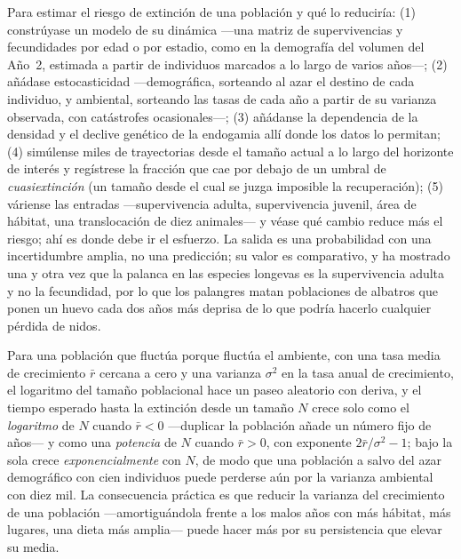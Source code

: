 \begin{method}\label{met:b3:conservation-biology:pva}
Para estimar el riesgo de extinción de una población y qué lo
reduciría: (1) constrúyase un modelo de su dinámica ---una matriz de
supervivencias y fecundidades por edad o por estadio, como en la
demografía del volumen del Año~2, estimada a partir de individuos
marcados a lo largo de varios años---; (2) añádase estocasticidad
---demográfica, sorteando al azar el destino de cada individuo, y
ambiental, sorteando las tasas de cada año a partir de su varianza
observada, con catástrofes ocasionales---; (3) añádanse la dependencia
de la densidad y el declive genético de la endogamia allí donde los
datos lo permitan; (4) simúlense miles de trayectorias desde el tamaño
actual a lo largo del horizonte de interés y regístrese la fracción que
cae por debajo de un umbral de \emph{cuasiextinción} (un tamaño desde
el cual se juzga imposible la recuperación); (5) váriense las entradas
---supervivencia adulta, supervivencia juvenil, área de hábitat, una
translocación de diez animales--- y véase qué cambio reduce más el
riesgo; ahí es donde debe ir el esfuerzo. La salida es una probabilidad
con una incertidumbre amplia, no una predicción; su valor es
comparativo, y ha mostrado una y otra vez que la palanca en las
especies longevas es la supervivencia adulta y no la fecundidad, por lo
que los palangres matan poblaciones de albatros que ponen un huevo cada
dos años más deprisa de lo que podría hacerlo cualquier pérdida de
nidos.
\end{method}

\begin{proposition}\label{prop:b3:conservation-biology:time}
Para una población que fluctúa porque fluctúa el ambiente, con una tasa
media de crecimiento $\bar r$ cercana a cero y una varianza
$\sigma^{2}$ en la tasa anual de crecimiento, el logaritmo del tamaño
poblacional hace un paseo aleatorio con deriva, y el tiempo esperado
hasta la extinción desde un tamaño $N$ crece solo como el
\emph{logaritmo} de $N$ cuando $\bar r < 0$ ---duplicar la población
añade un número fijo de años--- y como una \emph{potencia} de $N$
cuando $\bar r > 0$, con exponente $2\bar r/\sigma^{2} - 1$; bajo la
sola  crece \emph{exponencialmente} con $N$,
de modo que una población a salvo del azar demográfico con cien
individuos puede perderse aún por la varianza ambiental con diez mil. La
consecuencia práctica es que reducir la varianza del crecimiento de una
población ---amortiguándola frente a los malos años con más hábitat,
más lugares, una dieta más amplia--- puede hacer más por su
persistencia que elevar su media.
\end{proposition}
\admitted

